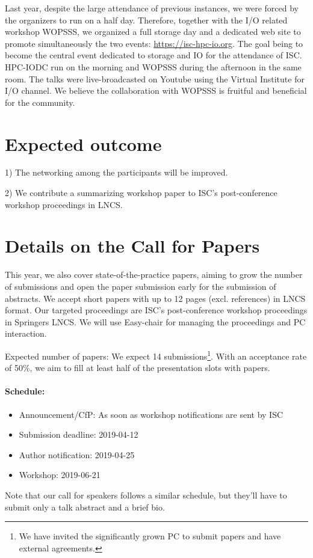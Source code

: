 \documentclass[a4paper,10pt]{article}
\begin{document}
Last year, despite the large attendance of previous instances, we were forced by the organizers to run on a half day.
Therefore, together with the I/O related workshop WOPSSS, we organized a full storage  day and a dedicated web site to promote simultaneously the two events: \url{https://isc-hpc-io.org}.
The goal being to become the central event dedicated to storage and IO for the attendance of ISC.
HPC-IODC run on the morning and WOPSSS during the afternoon in the same room.
The talks were live-broadcasted on Youtube using the Virtual Institute for I/O channel.
We believe the collaboration with WOPSSS is fruitful and beneficial for the community.

\section{Expected outcome}
1) The networking among the participants will be improved.

2) We contribute a summarizing workshop paper to ISC's post-conference workshop proceedings in LNCS.

\section{Details on the Call for Papers}

This year, we also cover state-of-the-practice papers, aiming to grow the number of submissions and open the paper submission early for the submission of abstracts.
We accept short papers with up to 12 pages (excl. references) in LNCS format.
Our targeted proceedings are ISC's post-conference workshop proceedings in Springers LNCS.
We will use Easy-chair for managing the proceedings and PC interaction.

Expected number of papers: We expect 14 submissions\footnote{We have invited the significantly grown PC to submit papers and have external agreements.}.
With an acceptance rate of 50\%, we aim to fill at least half of the presentation slots with papers.

\paragraph{Schedule:}
\begin{itemize}
  \item Announcement/CfP: As soon as workshop notifications are sent by ISC
  \item Submission deadline: 2019-04-12
  \item Author notification: 2019-04-25
  \item Workshop: 2019-06-21
\end{itemize}
Note that our call for speakers follows a similar schedule, but they'll have to submit only a talk abstract and a brief bio.
\end{document}
